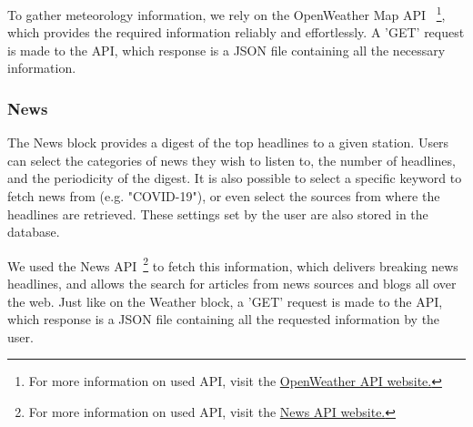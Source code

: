 To gather meteorology information, we rely on the OpenWeather Map \ac{API} ~\footnote{For more information on used API, visit the \href{https://openweathermap.org/api}{OpenWeather API website.}}, which provides the required information reliably and effortlessly. A 'GET' request is made to the \ac{API}, which response is a JSON file containing all the necessary information. 

\newpage
\subsubsection{News}

The News block provides a digest of the top headlines to a given station. Users can select the categories of news they wish to listen to, the number of headlines, and the periodicity of the digest. It is also possible to select a specific keyword to fetch news from (e.g. "COVID-19"), or even select the sources from where the headlines are retrieved. These settings set by the user are also stored in the database.

We used the News \ac{API}~\footnote{For more information on used API, visit the \href{https://newsapi.org/}{News API website.}} to fetch this information, which delivers breaking news headlines, and allows the search for articles from news sources and blogs all over the web. Just like on the Weather block, a 'GET' request is made to the \ac{API}, which response is a JSON file containing all the requested information by the user.

